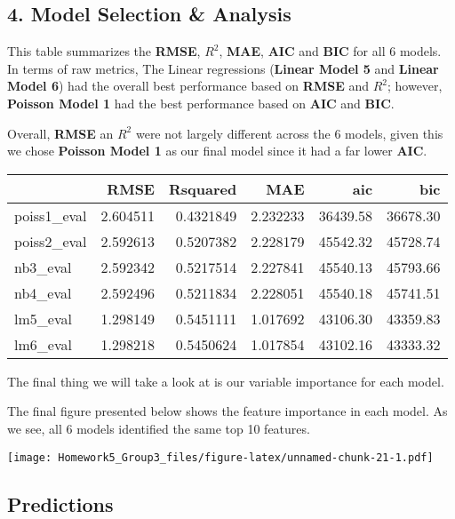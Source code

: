 \documentclass[
]{article}
\begin{document}
\hypertarget{model-selection-analysis}{%
\subsection{4. Model Selection \&
Analysis}\label{model-selection-analysis}}

This table summarizes the \textbf{RMSE}, \textbf{\(R^2\)}, \textbf{MAE},
\textbf{AIC} and \textbf{BIC} for all 6 models. In terms of raw metrics,
The Linear regressions (\textbf{Linear Model 5} and \textbf{Linear Model
6}) had the overall best performance based on \textbf{RMSE} and
\textbf{\(R^2\)}; however, \textbf{Poisson Model 1} had the best
performance based on \textbf{AIC} and \textbf{BIC}.

Overall, \textbf{RMSE} an \textbf{\(R^2\)} were not largely different
across the 6 models, given this we chose \textbf{Poisson Model 1} as our
final model since it had a far lower \textbf{AIC}.

\begin{table}[H]
\centering
\begin{tabular}{l|r|r|r|r|r}
\hline
  & RMSE & Rsquared & MAE & aic & bic\\
\hline
poiss1\_eval & 2.604511 & 0.4321849 & 2.232233 & 36439.58 & 36678.30\\
\hline
poiss2\_eval & 2.592613 & 0.5207382 & 2.228179 & 45542.32 & 45728.74\\
\hline
nb3\_eval & 2.592342 & 0.5217514 & 2.227841 & 45540.13 & 45793.66\\
\hline
nb4\_eval & 2.592496 & 0.5211834 & 2.228051 & 45540.18 & 45741.51\\
\hline
lm5\_eval & 1.298149 & 0.5451111 & 1.017692 & 43106.30 & 43359.83\\
\hline
lm6\_eval & 1.298218 & 0.5450624 & 1.017854 & 43102.16 & 43333.32\\
\hline
\end{tabular}
\end{table}

The final thing we will take a look at is our variable importance for
each model.

The final figure presented below shows the feature importance in each
model. As we see, all 6 models identified the same top 10 features.

\texttt{[image: Homework5\_Group3\_files/figure-latex/unnamed-chunk-21-1.pdf]}

\hypertarget{predictions}{%
\subsection{Predictions}\label{predictions}}
\end{document}
